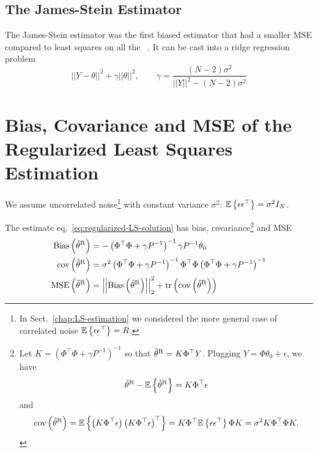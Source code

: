 \subsection{The James-Stein Estimator}
\label{sec:james-stein-estimator}

The James-Stein estimator was the first biased estimator that had a smaller MSE compared to least squares on all the ~\cite[page~3]{pillonetto}. It can be cast into a ridge regression problem
\begin{equation*}
  ||Y-\theta||^2 + \gamma ||\theta||^2,\hspace{2em} \gamma = \frac{(N-2)\sigma^2}{||Y||^2 - (N-2)\sigma^2}
\end{equation*}

\section{Bias, Covariance and MSE of the Regularized Least Squares Estimation}
\label{sec:bias-covariance-MSE-regLS-estimation}

We assume uncorrelated noise\footnote{In Sect.~\ref{chap:LS-estimation} we considered the more general case of correlated noise $\mathbb{E}\left\{\epsilon \epsilon^\top\right\} = R$.} with constant variance $\sigma^2$: $\mathbb{E}\left\{\epsilon \epsilon^\top\right\} = \sigma^2I_N$.

The estimate eq.~\eqref{eq:regularized-LS-solution} has bias, covariance\footnote{Let $K = \left(\Phi^\top\Phi + \gamma P^{-1}\right)^{-1}$ so that $\hat{\theta}^\textrm{R} = K\Phi^\top Y$. Plugging $Y=\Phi\theta_0+\epsilon$, we have
  \begin{equation*}
    \hat{\theta}^\textrm{R} - \mathbb{E}\left\{\hat{\theta}^\textrm{R}\right\} = K\Phi^\top\epsilon
  \end{equation*}
  and
  \begin{equation*}
    \textrm{cov}\left(\hat{\theta}^\textrm{R}\right) = \mathbb{E}\left\{\left(K\Phi^\top\epsilon\right) \left(K\Phi^\top\epsilon\right)^\top\right\} = K\Phi^\top \mathbb{E}\left\{\epsilon\epsilon^\top\right\} \Phi K = \sigma^2 K\Phi^\top\Phi K.
  \end{equation*}} and MSE
\begin{align*}
  \textrm{Bias}\left(\hat{\theta}^\textrm{R}\right) &= -\left(\Phi^\top\Phi + \gamma P^{-1}\right)^{-1}\gamma P^{-1}\theta_0 \\
  \textrm{cov}\left(\hat{\theta}^\textrm{R}\right) &= \sigma^2 \left(\Phi^\top\Phi + \gamma P^{-1}\right)^{-1} \Phi^\top\Phi \left(\Phi^\top\Phi + \gamma P^{-1}\right)^{-1} \\
  \textrm{MSE}\left(\hat{\theta}^\textrm{R}\right) &= \left|\left|\textrm{Bias}\left(\hat{\theta}^\textrm{R}\right)\right|\right|_2^2 + \textrm{tr}\left(\textrm{cov}\left(\hat{\theta}^\textrm{R}\right)\right)
\end{align*}

